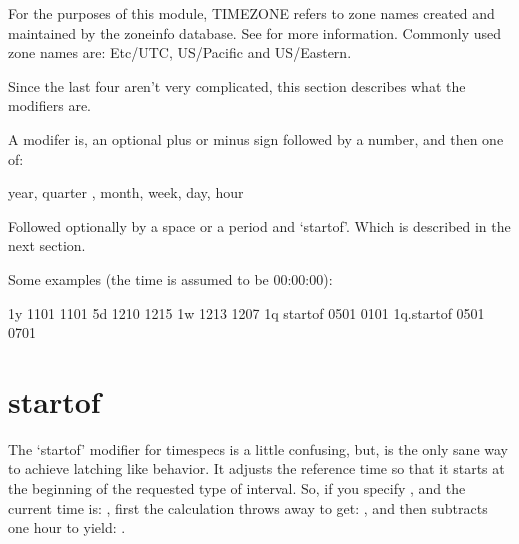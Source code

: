 \documentclass[letterpaper,10pt,english]{sphinxmanual}
\begin{document}
For the purposes of this module, TIMEZONE refers to zone names
created and maintained by the zoneinfo database.
See  for more information.
Commonly used zone names are: Etc/UTC, US/Pacific and US/Eastern.

Since the last four aren’t very complicated, this section describes
what the modifiers are.

A modifer is, an optional plus or minus sign followed by a number,
and then one of:

\begin{sphinxVerbatim}[commandchars=\\\{\}]
  year,   quarter ,   month,   week,   day,   hour
\end{sphinxVerbatim}

Followed optionally by a space or a period and ‘startof’.
Which is described in the next section.

Some examples (the time is assumed to be 00:00:00):

\begin{sphinxVerbatim}[commandchars=\\\{\}]
\PYGZhy{}1y         \PYGZhy{}11\PYGZhy{}01 \PYGZhy{}\PYGZgt{} \PYGZhy{}11\PYGZhy{}01
 5d         \PYGZhy{}12\PYGZhy{}10 \PYGZhy{}\PYGZgt{} \PYGZhy{}12\PYGZhy{}15
\PYGZhy{}1w         \PYGZhy{}12\PYGZhy{}13 \PYGZhy{}\PYGZgt{} \PYGZhy{}12\PYGZhy{}07
\PYGZhy{}1q startof \PYGZhy{}05\PYGZhy{}01 \PYGZhy{}\PYGZgt{} \PYGZhy{}01\PYGZhy{}01
 1q.startof \PYGZhy{}05\PYGZhy{}01 \PYGZhy{}\PYGZgt{} \PYGZhy{}07\PYGZhy{}01
\end{sphinxVerbatim}


\section{startof}
\label{\detokenize{mariadb-parted-fat:startof}}
The ‘startof’ modifier for timespecs is a little confusing,
but, is the only sane way to achieve latching like behavior.
It adjusts the reference time so that it starts at the beginning
of the requested type of interval. So, if you specify ,
and the current time is: , first the calculation
throws away  to get: , and then subtracts
one hour to yield: .
\end{document}
